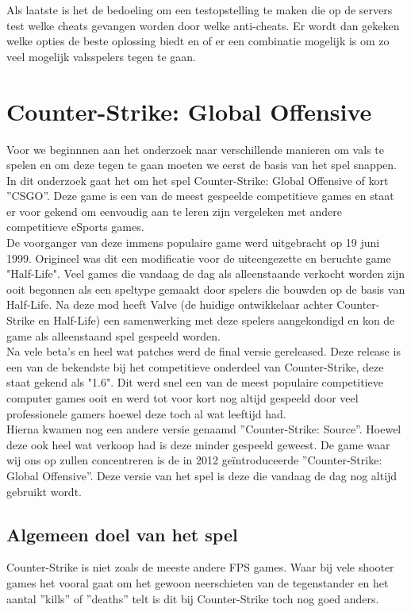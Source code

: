 \documentclass[pdftex,a4paper,12pt,twoside]{report}
\begin{document}
Als laatste is het de bedoeling om een testopstelling te maken die op de servers test welke cheats gevangen worden door welke anti-cheats. Er wordt dan gekeken welke opties de beste oplossing biedt en of er een combinatie mogelijk is om zo veel mogelijk valsspelers tegen te gaan. 


\chapter{Counter-Strike: Global Offensive}
\label{ch:csgo}
Voor we beginnnen aan het onderzoek naar verschillende manieren om vals te spelen en om deze tegen te gaan moeten we eerst de basis van het spel snappen. In dit onderzoek gaat het om het spel Counter-Strike: Global Offensive of kort ''CSGO''. Deze game is een van de meest gespeelde competitieve games en staat er voor gekend om eenvoudig aan te leren zijn vergeleken met andere competitieve eSports games. 
\\

De voorganger van deze immens populaire game werd uitgebracht op 19 juni 1999. Origineel was dit een modificatie voor de uiteengezette en beruchte game "Half-Life". Veel games die vandaag de dag als alleenstaande verkocht worden zijn ooit begonnen als een speltype gemaakt door spelers die bouwden op de basis van Half-Life. Na deze mod heeft Valve (de huidige ontwikkelaar achter Counter-Strike en Half-Life) een samenwerking met deze spelers aangekondigd en kon de game als alleenstaand spel gespeeld worden.
\\

Na vele beta's en heel wat patches werd de final versie gereleased. Deze release is een van de bekendste bij het competitieve onderdeel van Counter-Strike, deze staat gekend als "1.6". Dit werd snel een van de meest populaire competitieve computer games ooit en werd tot voor kort nog altijd gespeeld door veel professionele gamers hoewel deze toch al wat leeftijd had.
\citep{dusttodust}
\\

Hierna kwamen nog een andere versie genaamd ''Counter-Strike: Source''. Hoewel deze ook heel wat verkoop had is deze minder gespeeld geweest. De game waar wij ons op zullen concentreren is de in 2012 geïntroduceerde ''Counter-Strike: Global Offensive''. Deze versie van het spel is deze die vandaag de dag nog altijd gebruikt wordt.

\section{Algemeen doel van het spel}
\label{sec:algemeen doel van het spel}
Counter-Strike is niet zoals de meeste andere FPS games. Waar bij vele shooter games het vooral gaat om het gewoon neerschieten van de tegenstander en het aantal ''kills'' of ''deaths'' telt is dit bij Counter-Strike toch nog goed anders.
\\
\end{document}
